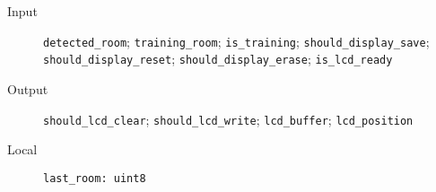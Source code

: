 \begin{flushleft}
  \begin{description}
    \item [Input]
      \verb#detected_room#;
      \verb#training_room#;
      \verb#is_training#;
      \verb#should_display_save#;
      \verb#should_display_reset#;
      \verb#should_display_erase#;
      \verb#is_lcd_ready#
    \item [Output]
      \verb#should_lcd_clear#;
      \verb#should_lcd_write#;
      \verb#lcd_buffer#;
      \verb#lcd_position#
    \item [Local]
      \verb#last_room: uint8#
  \end{description}
\end{flushleft}
